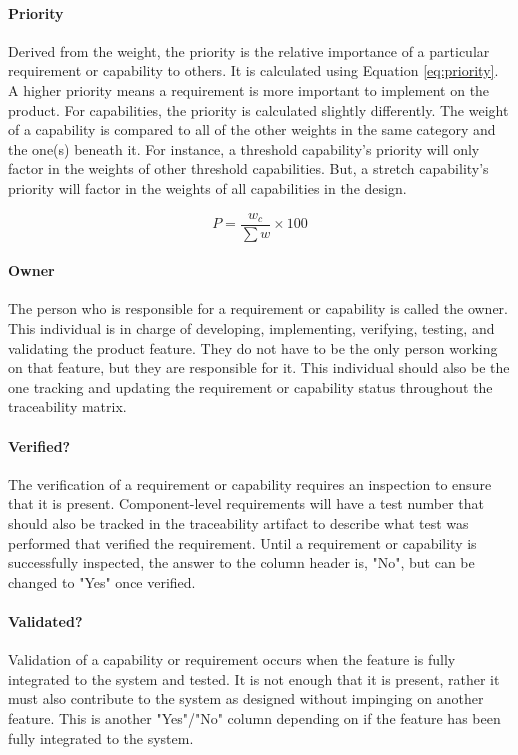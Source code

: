 \paragraph*{Priority} Derived from the weight, the priority is the relative importance of a particular requirement or capability to others.
It is calculated using Equation \ref{eq:priority}. 
A higher priority means a requirement is more important to implement on the product.
For capabilities, the priority is calculated slightly differently.
The weight of a capability is compared to all of the other weights in the same category and the one(s) beneath it.
For instance, a threshold capability's priority will only factor in the weights of other threshold capabilities.
But, a stretch capability's priority will factor in the weights of all capabilities in the design.

\begin{equation} \label{eq:priority}
    P = \frac{w_c}{\sum w} \times 100
\end{equation}

\paragraph*{Owner} The person who is responsible for a requirement or capability is called the owner.
This individual is in charge of developing, implementing, verifying, testing, and validating the product feature.
They do not have to be the only person working on that feature, but they are responsible for it.
This individual should also be the one tracking and updating the requirement or capability status throughout the traceability matrix. 

\paragraph*{Verified?} The verification of a requirement or capability requires an inspection to ensure that it is present.
Component-level requirements will have a test number that should also be tracked in the traceability artifact to describe what test was performed that verified the requirement.
Until a requirement or capability is successfully inspected, the answer to the column header is, "No", but can be changed to "Yes" once verified.

\paragraph*{Validated?} Validation of a capability or requirement occurs when the feature is fully integrated to the system and tested.
It is not enough that it is present, rather it must also contribute to the system as designed without impinging on another feature.
This is another "Yes"/"No" column depending on if the feature has been fully integrated to the system.

